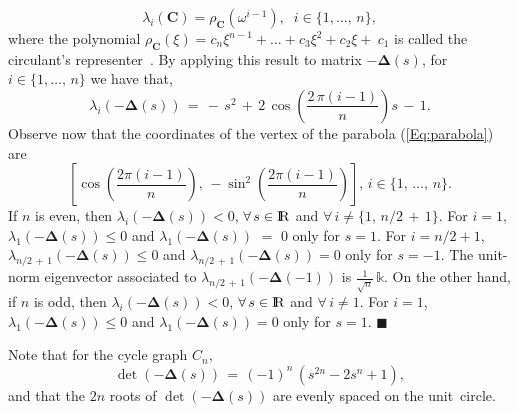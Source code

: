 \documentclass[letterpaper,9pt,twocolumn]{autart}
\newcommand{\rr}{\mathop{{\rm I}\mskip-4.0mu{\rm R}}\nolimits}
\newcommand{\vet}[1]{\ensuremath{{\mathbf #1}}}
\begin{document}
\begin{proposition}
\begin{equation}
\lambda_i(\vet{C}) = \rho_{\vet{C}}(\omega^{i-1}),\;\; i \in \{1,\ldots,\,n\},
\end{equation}
where the polynomial $\rho_{\vet{C}}(\xi) = c_n \xi^{n-1} + \ldots + c_3 \xi^{2} + c_2 \xi +~c_1$
is called the circulant's representer~\cite[Th. 3.2.2]{Davis_book94}.
By applying this result to matrix $-\boldsymbol{\Delta}(s)$, for $i \in \{1,\ldots,\,n\}$ we have that,
\begin{equation}\label{Eq:parabola}
\lambda_i(-\boldsymbol{\Delta}(s)) \,=\, -\,s^2 \,+\, 2\,\cos\!\left(\frac{2\,\pi(i-1)}{n}\right)s \,-\,1.
\end{equation}
Observe now that the coordinates of the vertex of the
parabola (\ref{Eq:parabola}) are
$$
\left[\cos\!\left(\frac{2\pi(i - 1)}{n}\right),\,-\sin^2\!\left(\frac{2\pi(i-1)}{n}\right)\!\right],\, i \in \{1,\,\ldots,\,n\}.
$$
If $n$ is even, then $\lambda_i(-\boldsymbol{\Delta}(s)) < 0$, $\forall\, s \in \rr$
and $\forall\, i \neq \{1,\,n/2\,+\,1\}$. For $i = 1$, $\lambda_1(-\boldsymbol{\Delta}(s)) \leq 0$
and $\lambda_1(-\boldsymbol{\Delta}(s)) \,\,{=}\,\, 0$ only for $s = 1$.
For $i = n/2 + 1$, $\lambda_{n/2\,+\,1}(-\boldsymbol{\Delta}(s)) \leq 0$
and $\lambda_{n/2\,+\,1}(-\boldsymbol{\Delta}(s)) = 0$ only for $s = -1$.
The unit-norm eigenvector associated to $\lambda_{n/2\,+\,1}(-\boldsymbol{\Delta}(-1))$ is
$\frac{1}{\sqrt{n}}\,\mathds{k}$.
On the other hand, if $n$ is odd, then $\lambda_i(-\boldsymbol{\Delta}(s)) < 0$,
$\forall\, s \in \rr$ and $\forall\, i \neq 1$. For $i = 1$,
$\lambda_1(-\boldsymbol{\Delta}(s)) \leq 0$ and $\lambda_1(-\boldsymbol{\Delta}(s)) = 0$ only for $s = 1$.
\hfill$\blacksquare$
\end{proposition}
Note that for the cycle graph $C_n$,
$$
\det(-\boldsymbol{\Delta}(s)) \,=\, (-1)^{n}\,(s^{2n} - 2s^n + 1),
$$
and that the $2n$ roots of $\det(-\boldsymbol{\Delta}(s))$ are evenly spaced on the
unit~circle. 
\end{document}

